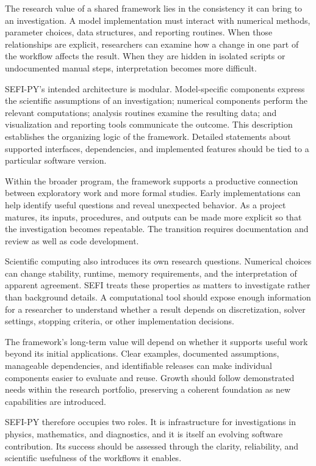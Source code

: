 \documentclass[10pt,letterpaper]{article}
\begin{document}
The research value of a shared framework lies in the consistency it can bring to an investigation. A model implementation must interact with numerical methods, parameter choices, data structures, and reporting routines. When those relationships are explicit, researchers can examine how a change in one part of the workflow affects the result. When they are hidden in isolated scripts or undocumented manual steps, interpretation becomes more difficult.

SEFI-PY's intended architecture is modular. Model-specific components express the scientific assumptions of an investigation; numerical components perform the relevant computations; analysis routines examine the resulting data; and visualization and reporting tools communicate the outcome. This description establishes the organizing logic of the framework. Detailed statements about supported interfaces, dependencies, and implemented features should be tied to a particular software version.

Within the broader program, the framework supports a productive connection between exploratory work and more formal studies. Early implementations can help identify useful questions and reveal unexpected behavior. As a project matures, its inputs, procedures, and outputs can be made more explicit so that the investigation becomes repeatable. The transition requires documentation and review as well as code development.

Scientific computing also introduces its own research questions. Numerical choices can change stability, runtime, memory requirements, and the interpretation of apparent agreement. SEFI treats these properties as matters to investigate rather than background details. A computational tool should expose enough information for a researcher to understand whether a result depends on discretization, solver settings, stopping criteria, or other implementation decisions.

The framework's long-term value will depend on whether it supports useful work beyond its initial applications. Clear examples, documented assumptions, manageable dependencies, and identifiable releases can make individual components easier to evaluate and reuse. Growth should follow demonstrated needs within the research portfolio, preserving a coherent foundation as new capabilities are introduced.

SEFI-PY therefore occupies two roles. It is infrastructure for investigations in physics, mathematics, and diagnostics, and it is itself an evolving software contribution. Its success should be assessed through the clarity, reliability, and scientific usefulness of the workflows it enables.
\end{document}
